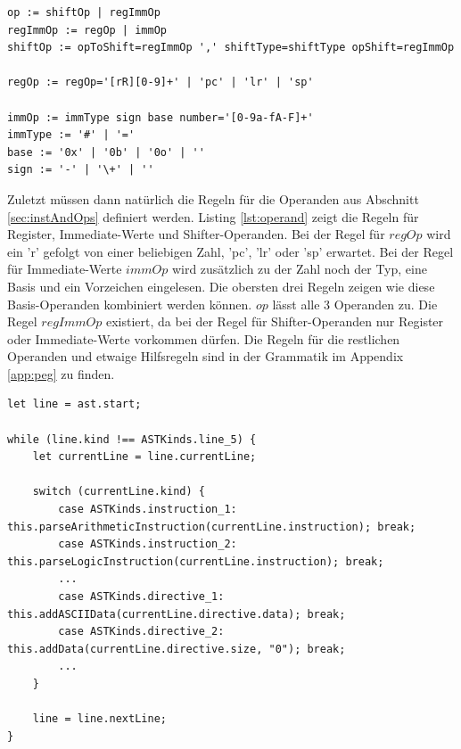\documentclass[a4paper, 11pt, onecolumn]{article}
\begin{document}
\begin{lstlisting}[basicstyle=\ttfamily\footnotesize, backgroundcolor=\color{backcolour}, caption={Operanden}, captionpos=b, label={lst:operand},float,floatplacement=H]
op := shiftOp | regImmOp
regImmOp := regOp | immOp
shiftOp := opToShift=regImmOp ',' shiftType=shiftType opShift=regImmOp

regOp := regOp='[rR][0-9]+' | 'pc' | 'lr' | 'sp'

immOp := immType sign base number='[0-9a-fA-F]+'
immType := '#' | '='
base := '0x' | '0b' | '0o' | ''
sign := '-' | '\+' | ''
\end{lstlisting}

Zuletzt müssen dann natürlich die Regeln für die Operanden aus Abschnitt \ref{sec:instAndOps} definiert werden. Listing \ref{lst:operand} zeigt die Regeln für Register, Immediate-Werte und Shifter-Operanden. Bei der Regel für $regOp$ wird ein 'r' gefolgt von einer beliebigen Zahl, 'pc', 'lr' oder 'sp' erwartet. Bei der Regel für Immediate-Werte $immOp$ wird zusätzlich zu der Zahl noch der Typ, eine Basis und ein Vorzeichen eingelesen. Die obersten drei Regeln zeigen wie diese Basis-Operanden kombiniert werden können. $op$ lässt alle 3 Operanden zu. Die Regel $regImmOp$ existiert, da bei der Regel für Shifter-Operanden nur Register oder Immediate-Werte vorkommen dürfen. Die Regeln für die restlichen Operanden und etwaige Hilfsregeln sind in der Grammatik im Appendix \ref{app:peg} zu finden.\\

\begin{lstlisting}[style=JavaScript, basicstyle=\footnotesize, backgroundcolor=\color{backcolour}, caption={Abarbeiten des abstrakten Syntaxbaumes in UserInputParser.ts}, captionpos=b, label={lst:userinputparser}]
let line = ast.start;

while (line.kind !== ASTKinds.line_5) {
    let currentLine = line.currentLine;

    switch (currentLine.kind) {
        case ASTKinds.instruction_1: this.parseArithmeticInstruction(currentLine.instruction); break;
        case ASTKinds.instruction_2: this.parseLogicInstruction(currentLine.instruction); break;
        ...
        case ASTKinds.directive_1: this.addASCIIData(currentLine.directive.data); break;
        case ASTKinds.directive_2: this.addData(currentLine.directive.size, "0"); break;
        ...
    }

    line = line.nextLine;
}
\end{lstlisting}
\end{document}

